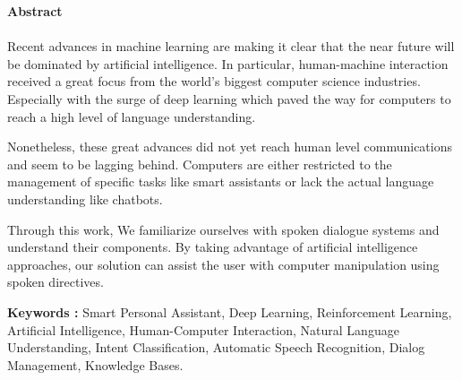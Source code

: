 \vspace*{0.8cm}


\begin{center}
    \Large 
    \textbf{Abstract}
\end{center}

\paragraph{}
Recent advances in machine learning are making it clear that the near future will be dominated by artificial intelligence. In particular, human-machine interaction received a great focus from the world's biggest computer science industries. Especially with the surge of deep learning which paved the way for computers to reach a high level of language understanding.

Nonetheless, these great advances did not yet reach human level communications and seem to be lagging behind. Computers are either restricted to the management of specific tasks like smart assistants or lack the actual language understanding like chatbots.

Through this work, We familiarize ourselves with spoken dialogue systems and understand their components. By taking advantage of artificial intelligence approaches, our solution can assist the user with computer manipulation using spoken directives.

\noindent
\textbf{Keywords :} Smart Personal Assistant, Deep Learning, Reinforcement Learning, Artificial Intelligence, Human-Computer Interaction, Natural Language Understanding, Intent Classification, Automatic Speech Recognition, Dialog Management, Knowledge Bases.